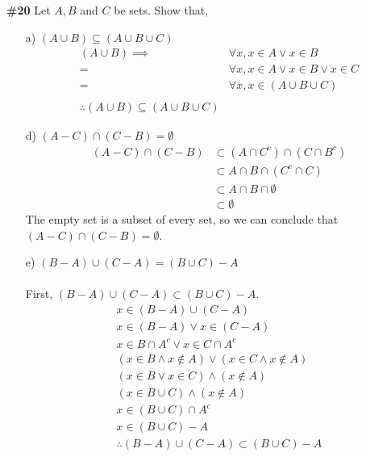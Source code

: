 \documentclass{article}
\newcommand{\problem}[1]{\textbf{\##1}}
\newcommand{\prob}[1]{\problem{#1}}
\renewcommand{\And}{\wedge}
\newcommand{\Or}{\vee}
\newcommand{\intersection}{\cap}
\newcommand{\union}{\cup}
\begin{document}
\pagebreak
\prob{20}
Let \(A, B\) and \(C\) be sets. Show that,

\begin{enumerate}
    \item [a)] \((A \union B) \subseteq (A \union B  \union C)\)
    \begin{align*}
        (A \union B) \implies &\forall x, x \in A \Or x \in B\\
        = &\forall x, x \in A \Or x \in B \Or x \in C\\
        = &\forall x, x \in (A \union B \union C)\\\\
        \therefore (A \union B) \subseteq (A \union B  \union C)
    \end{align*}
    \item [d)] \((A - C) \intersection (C - B) = \emptyset\)
    \begin{align*}
        (A - C) \intersection (C - B) &\subset (A \intersection C^{c}) \intersection (C \intersection B^{c})\\
        &\subset A \intersection B \intersection (C^{c} \intersection C)\\
        &\subset A \intersection B \intersection \emptyset\\
        &\subset \emptyset
    \end{align*}
    The empty set is a subset of every set, so we can conclude that \((A - C) \intersection (C - B) = \emptyset\).
    \item [e)]
    \((B-A)\union (C-A) = (B \union C)-A\)\\\\
    First, \((B-A)\union (C-A) \subset (B\union C)-A\).
    \begin{align*}
        x \in (B-A) \union (C-A)\\
        x \in (B-A) \Or x \in (C-A)\\
        x \in B \intersection A^{c} \Or x \in C \intersection A^{c}\\
        (x \in  B \And x \notin A) \Or (x \in C \And x \notin A)\\
        (x \in B \Or x \in C) \And (x \notin A)\\
        (x \in B \union C) \And (x \notin A)\\
        x \in (B \union C) \intersection A^{c}\\
        x \in (B \union C) - A\\
        \therefore (B-A)\union (C-A) \subset (B\union C)-A
    \end{align*}

\end{enumerate}
\end{document}
